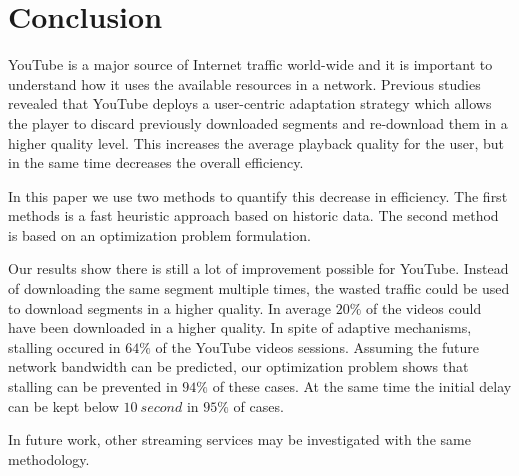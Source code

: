 
\section{Conclusion}
\label{sec:conclusion}

YouTube is a major source of Internet traffic world-wide and it is important to understand how it uses the available resources in a network.
Previous studies revealed that YouTube deploys a user-centric adaptation strategy which allows the player to discard previously downloaded segments and re-download them in a higher quality level.
This increases the average playback quality for the user, but in the same time decreases the overall efficiency.

In this paper we use two methods to quantify this decrease in efficiency.
The first methods is a fast heuristic approach based on historic data.
The second method is based on an optimization problem formulation.

Our results show there is still a lot of improvement possible for YouTube. Instead of downloading the same segment multiple times, the wasted traffic could be used to download segments in a higher quality. In average $20\%$ of the videos could have been downloaded in a higher quality. In spite of adaptive mechanisms, stalling occured in $64\%$ of the YouTube videos sessions. Assuming the future network bandwidth can be predicted, our optimization problem shows that stalling can be prevented in $94\%$ of these cases. At the same time the initial delay can be kept below $\SI{10}{second}$ in $95\%$ of cases.

In future work, other streaming services may be investigated with the same methodology.